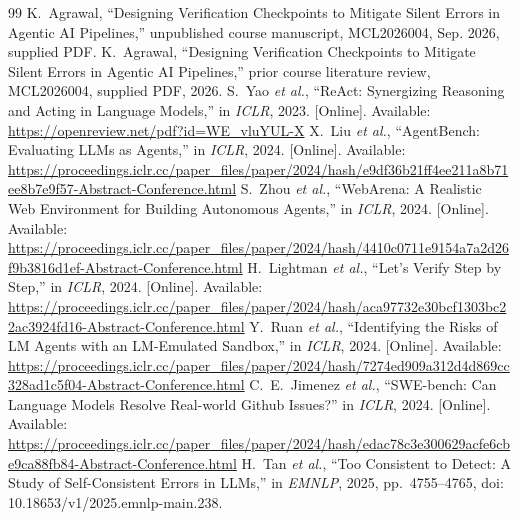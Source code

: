 \documentclass[conference]{IEEEtran}
\begin{document}
\begin{thebibliography}{99}
 K.~Agrawal, ``Designing Verification Checkpoints to Mitigate Silent Errors in Agentic AI Pipelines,'' unpublished course manuscript, MCL2026004, Sep. 2026, supplied PDF.
 K.~Agrawal, ``Designing Verification Checkpoints to Mitigate Silent Errors in Agentic AI Pipelines,'' prior course literature review, MCL2026004, supplied PDF, 2026.
 S.~Yao \emph{et al.}, ``ReAct: Synergizing Reasoning and Acting in Language Models,'' in \emph{ICLR}, 2023. [Online]. Available: \url{https://openreview.net/pdf?id=WE_vluYUL-X}
 X.~Liu \emph{et al.}, ``AgentBench: Evaluating LLMs as Agents,'' in \emph{ICLR}, 2024. [Online]. Available: \url{https://proceedings.iclr.cc/paper_files/paper/2024/hash/e9df36b21ff4ee211a8b71ee8b7e9f57-Abstract-Conference.html}
 S.~Zhou \emph{et al.}, ``WebArena: A Realistic Web Environment for Building Autonomous Agents,'' in \emph{ICLR}, 2024. [Online]. Available: \url{https://proceedings.iclr.cc/paper_files/paper/2024/hash/4410c0711e9154a7a2d26f9b3816d1ef-Abstract-Conference.html}
 H.~Lightman \emph{et al.}, ``Let's Verify Step by Step,'' in \emph{ICLR}, 2024. [Online]. Available: \url{https://proceedings.iclr.cc/paper_files/paper/2024/hash/aca97732e30bcf1303bc22ac3924fd16-Abstract-Conference.html}
 Y.~Ruan \emph{et al.}, ``Identifying the Risks of LM Agents with an LM-Emulated Sandbox,'' in \emph{ICLR}, 2024. [Online]. Available: \url{https://proceedings.iclr.cc/paper_files/paper/2024/hash/7274ed909a312d4d869cc328ad1c5f04-Abstract-Conference.html}
 C.~E.~Jimenez \emph{et al.}, ``SWE-bench: Can Language Models Resolve Real-world Github Issues?'' in \emph{ICLR}, 2024. [Online]. Available: \url{https://proceedings.iclr.cc/paper_files/paper/2024/hash/edac78c3e300629acfe6cbe9ca88fb84-Abstract-Conference.html}
 H.~Tan \emph{et al.}, ``Too Consistent to Detect: A Study of Self-Consistent Errors in LLMs,'' in \emph{EMNLP}, 2025, pp.~4755--4765, doi: 10.18653/v1/2025.emnlp-main.238.
\end{thebibliography}
\end{document}
